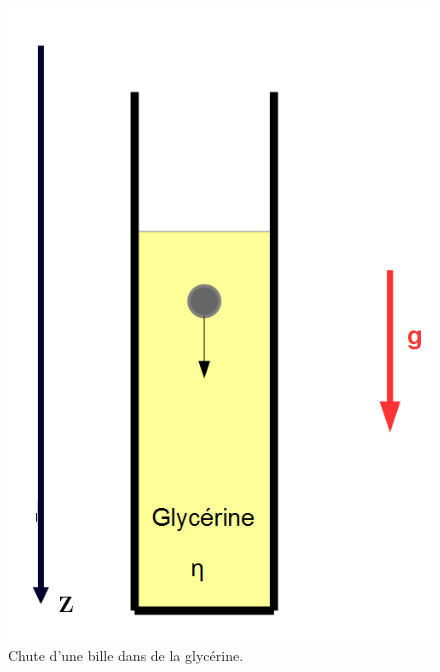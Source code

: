 \documentclass[11pt,a4paper]{report}
\begin{document}
\begin{figure}[h!]
\begin{center}
	\includegraphics[scale = 0.3]{chute_visco.png}
	\caption{Chute d'une bille dans de la glycérine.} 
	\label{fig:chute_visco}
\end{center}
\end{figure}
\end{document}
